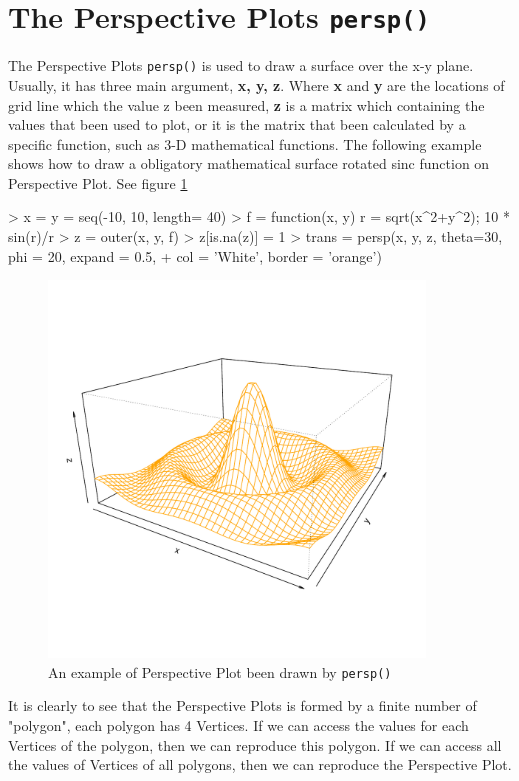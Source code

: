 \documentclass[paper=a4, fontsize=11pt]{report}
\begin{document}
\section{The Perspective Plots \texttt{persp()}}
The Perspective Plots \texttt{persp()} is used to draw a surface over the x-y plane. Usually, it has three main argument, \textbf{x, y, z}. Where \textbf{x} and \textbf{y} are the locations of grid line which the value z been measured, \textbf{z} is a matrix which containing the values that been used to plot, or it is the matrix that been calculated by a specific function, such as 3-D mathematical functions. The following example shows how to draw a obligatory mathematical surface rotated sinc function on Perspective Plot. See figure \ref{figure_3.1}
\begin{Schunk}
\begin{Sinput}
> x = y = seq(-10, 10, length= 40)
> f = function(x, y) { r = sqrt(x^2+y^2); 10 * sin(r)/r }
> z = outer(x, y, f)
> z[is.na(z)] = 1
> trans = persp(x, y, z, theta=30, phi = 20, expand = 0.5,
+               col = 'White', border = 'orange')
\end{Sinput}
\end{Schunk}
\begin{figure}[h]
\begin{center}
  \includegraphics[height = 10cm, width = 10cm]{figure/standalone_1.pdf}
  \caption{An example of Perspective Plot been drawn by \texttt{persp()}}
  	\label{figure_3.1}
\end{center}
\end{figure}

It is clearly to see that the Perspective Plots is formed by a finite number of "polygon", each polygon has 4 Vertices. If we can access the values for each Vertices of the polygon, then we can reproduce this polygon. If we can access all the values of Vertices of all polygons, then we can reproduce the Perspective Plot. \\
\end{document}

